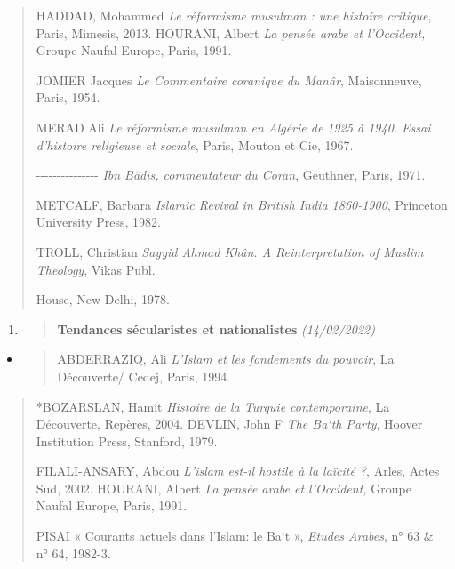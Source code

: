 \begin{quote}
HADDAD, Mohammed \emph{Le réformisme musulman : une histoire critique},
Paris, Mimesis, 2013. HOURANI, Albert \emph{La pensée arabe et
l'Occident,} Groupe Naufal Europe, Paris, 1991.

JOMIER Jacques \emph{Le Commentaire coranique du Manâr}, Maisonneuve,
Paris, 1954.

MERAD Ali \emph{Le réformisme musulman en Algérie de 1925 à 1940. Essai
d'histoire religieuse et sociale}, Paris, Mouton et Cie, 1967.

-\/-\/-\/-\/-\/-\/-\/-\/-\/-\/-\/-\/-\/-\/- \emph{Ibn Bâdis,
commentateur du Coran}, Geuthner, Paris, 1971.

METCALF, Barbara \emph{Islamic Revival in British India 1860-1900},
Princeton University Press, 1982.

TROLL, Christian \emph{Sayyid Ahmad Khân. A Reinterpretation of Muslim
Theology}, Vikas Publ.

House, New Delhi, 1978.
\end{quote}

\begin{enumerate}
\def\labelenumi{\arabic{enumi}.}
\item
  \begin{quote}
  \textbf{{Tendances sécularistes et nationalistes}}
  \emph{(14/02/2022)}
  \end{quote}
\end{enumerate}

\begin{itemize}
\item
  \begin{quote}
  ABDERRAZIQ, Ali \emph{L'Islam et les fondements du pouvoir}, La
  Découverte/ Cedej, Paris, 1994.
  \end{quote}
\end{itemize}

\begin{quote}
*BOZARSLAN, Hamit \emph{Histoire de la Turquie contemporaine}, La
Découverte, Repères, 2004. DEVLIN, John F \emph{The Ba`th Party}, Hoover
Institution Press, Stanford, 1979.

FILALI-ANSARY, Abdou \emph{L'islam est-il hostile à la laïcité ?},
Arles, Actes Sud, 2002. HOURANI, Albert \emph{La pensée arabe et
l'Occident,} Groupe Naufal Europe, Paris, 1991.

PISAI « Courants actuels dans l'Islam: le Ba`t », \emph{Etudes Arabes},
n° 63 \& n° 64, 1982-3.
\end{quote}

